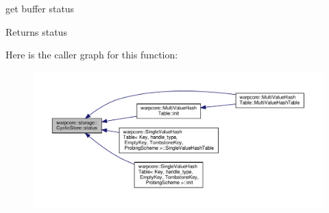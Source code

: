 get buffer status 

\begin{DoxyReturn}{Returns}
status 
\end{DoxyReturn}
Here is the caller graph for this function\+:
\nopagebreak
\begin{figure}[H]
\begin{center}
\leavevmode
\includegraphics[width=350pt]{classwarpcore_1_1storage_1_1CyclicStore_ab6c224b2b5a49d93dc7e052ec7b8cc32_icgraph}
\end{center}
\end{figure}
